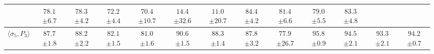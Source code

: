\begin{table}[!htb]
\begin{adjustwidth}{-2.25in}{0in}
\begin{tabular}{c|cccc|cccc|cccc}
  & $78.1$ \scriptsize $\pm 6.7$
  & $78.3$ \scriptsize $\pm 4.2$
  & $72.2$ \scriptsize $\pm 4.4$
  & $70.4$ \scriptsize $\pm 10.7$
  & $14.4$ \scriptsize $\pm 32.6$
  & $11.0$ \scriptsize $\pm 20.7$
  & \underline{$84.4$} \scriptsize $\pm 4.2$
  & $81.4$ \scriptsize $\pm 6.6$
  & $79.0$ \scriptsize $\pm 5.5$
  & $83.3$ \scriptsize $\pm 4.8$
\\\hline
$\langle\sigma_5,P_3\rangle$
  & $87.7$ \scriptsize $\pm 1.8$
  & $\mathbf{88.2}$ \scriptsize $\pm 2.2$
  & $82.1$ \scriptsize $\pm 1.5$
  & $81.0$ \scriptsize $\pm 1.6$
  & $90.6$ \scriptsize $\pm 1.5$
  & $88.3$ \scriptsize $\pm 1.4$
  & $87.8$ \scriptsize $\pm 3.2$
  & $77.9$ \scriptsize $\pm 26.7$
  & \underline{$95.8$} \scriptsize $\pm 0.9$
  & $94.5$ \scriptsize $\pm 2.1$
  & $93.3$ \scriptsize $\pm 2.1$
  & $94.2$ \scriptsize $\pm 0.7$
\\\hline
\end{tabular}
\label{tab:extendedMLLMbenchmark}
\end{adjustwidth}
\end{table}

